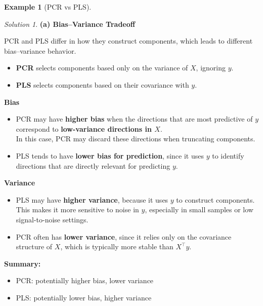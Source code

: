 \documentclass[
  english,
]{article}
\providecommand{\tightlist}{%
  \setlength{\itemsep}{0pt}\setlength{\parskip}{0pt}}
\theoremstyle{definition}
\newtheorem{example}{Example}[section]
\theoremstyle{definition}
\theoremstyle{remark}
\newtheorem*{solution}{Solution}
\begin{document}
\begin{example}[PCR vs PLS]
\end{example}

\begin{solution}
\textbf{(a) Bias--Variance Tradeoff}

PCR and PLS differ in how they construct components, which leads to
different bias--variance behavior.

\begin{itemize}
\tightlist
\item
  \textbf{PCR} selects components based only on the variance of \(X\),
  ignoring \(y\).
\item
  \textbf{PLS} selects components based on their covariance with \(y\).
\end{itemize}

\textbf{Bias}

\begin{itemize}
\item
  PCR may have \textbf{higher bias} when the directions that are most
  predictive of \(y\) correspond to \textbf{low-variance directions in
  \(X\)}.\\
  In this case, PCR may discard these directions when truncating
  components.
\item
  PLS tends to have \textbf{lower bias for prediction}, since it uses
  \(y\) to identify directions that are directly relevant for predicting
  \(y\).
\end{itemize}

\textbf{Variance}

\begin{itemize}
\item
  PLS may have \textbf{higher variance}, because it uses \(y\) to
  construct components.\\
  This makes it more sensitive to noise in \(y\), especially in small
  samples or low signal-to-noise settings.
\item
  PCR often has \textbf{lower variance}, since it relies only on the
  covariance structure of \(X\), which is typically more stable than
  \(X^\top y\).
\end{itemize}

\textbf{Summary:}

\begin{itemize}
\tightlist
\item
  PCR: potentially higher bias, lower variance\\
\item
  PLS: potentially lower bias, higher variance
\end{itemize}


\end{solution}
\end{document}
